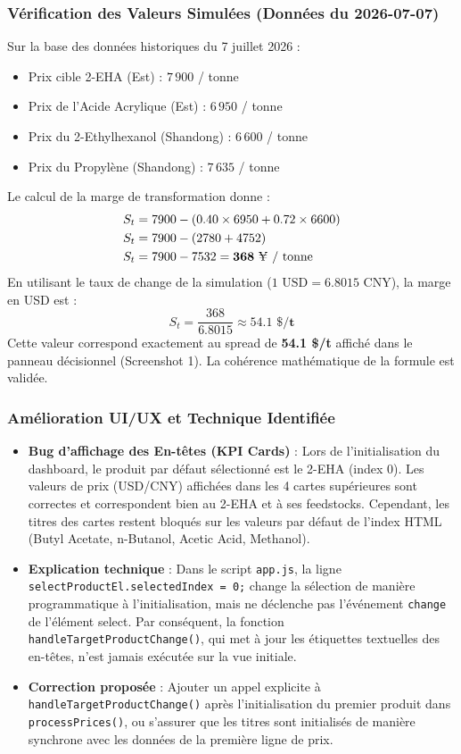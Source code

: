 \documentclass[12pt,a4paper]{article}
\begin{document}
\subsubsection{Vérification des Valeurs Simulées (Données du 2026-07-07)}
Sur la base des données historiques du 7 juillet 2026 :
\begin{itemize}
    \item Prix cible 2-EHA (Est) : $7\,900$ \yen / tonne
    \item Prix de l'Acide Acrylique (Est) : $6\,950$ \yen / tonne
    \item Prix du 2-Ethylhexanol (Shandong) : $6\,600$ \yen / tonne
    \item Prix du Propylène (Shandong) : $7\,635$ \yen / tonne
\end{itemize}
Le calcul de la marge de transformation donne :
\begin{align*}
S_t &= 7900 - (0.40 \times 6950 + 0.72 \times 6600) \\
S_t &= 7900 - (2780 + 4752) \\
S_t &= 7900 - 7532 = \mathbf{368\text{ \yen{} / tonne}}
\end{align*}
En utilisant le taux de change de la simulation ($\text{1 USD} = 6.8015\text{ CNY}$), la marge en USD est :
\begin{equation*}
S_t = \frac{368}{6.8015} \approx \mathbf{54.1\text{ \$/t}}
\end{equation*}
Cette valeur correspond exactement au spread de \textbf{54.1 \$/t} affiché dans le panneau décisionnel (Screenshot 1). La cohérence mathématique de la formule est validée.

\subsubsection{Amélioration UI/UX et Technique Identifiée}
\begin{itemize}
    \item \textbf{Bug d'affichage des En-têtes (KPI Cards)} : Lors de l'initialisation du dashboard, le produit par défaut sélectionné est le 2-EHA (index 0). Les valeurs de prix (USD/CNY) affichées dans les 4 cartes supérieures sont correctes et correspondent bien au 2-EHA et à ses feedstocks. Cependant, les titres des cartes restent bloqués sur les valeurs par défaut de l'index HTML (Butyl Acetate, n-Butanol, Acetic Acid, Methanol).
    \item \textbf{Explication technique} : Dans le script \texttt{app.js}, la ligne \texttt{selectProductEl.selectedIndex = 0;} change la sélection de manière programmatique à l'initialisation, mais ne déclenche pas l'événement \texttt{change} de l'élément select. Par conséquent, la fonction \texttt{handleTargetProductChange()}, qui met à jour les étiquettes textuelles des en-têtes, n'est jamais exécutée sur la vue initiale.
    \item \textbf{Correction proposée} : Ajouter un appel explicite à \texttt{handleTargetProductChange()} après l'initialisation du premier produit dans \texttt{processPrices()}, ou s'assurer que les titres sont initialisés de manière synchrone avec les données de la première ligne de prix.
\end{itemize}
\end{document}
